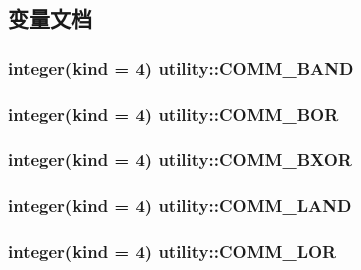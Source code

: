 \subsection{变量文档}
\hypertarget{namespaceutility_ad6a4a4dc93ce4c7954383fd79547415e}{
\subsubsection[{COMM\_\-BAND}]{\setlength{\rightskip}{0pt plus 5cm}integer(kind = 4) {\bf utility::COMM\_\-BAND}}}
\label{namespaceutility_ad6a4a4dc93ce4c7954383fd79547415e}
\hypertarget{namespaceutility_a571a1353450878c872ab821842c903bb}{
\subsubsection[{COMM\_\-BOR}]{\setlength{\rightskip}{0pt plus 5cm}integer(kind = 4) {\bf utility::COMM\_\-BOR}}}
\label{namespaceutility_a571a1353450878c872ab821842c903bb}
\hypertarget{namespaceutility_a1738a7d6502f88e9dc6b93be81f43faf}{
\subsubsection[{COMM\_\-BXOR}]{\setlength{\rightskip}{0pt plus 5cm}integer(kind = 4) {\bf utility::COMM\_\-BXOR}}}
\label{namespaceutility_a1738a7d6502f88e9dc6b93be81f43faf}
\hypertarget{namespaceutility_a9f57cfbd8fe711ae3aa4fd939befe32d}{
\subsubsection[{COMM\_\-LAND}]{\setlength{\rightskip}{0pt plus 5cm}integer(kind = 4) {\bf utility::COMM\_\-LAND}}}
\label{namespaceutility_a9f57cfbd8fe711ae3aa4fd939befe32d}
\hypertarget{namespaceutility_a84fc0cdbf8b54f2cff80170d1dd375b5}{
\subsubsection[{COMM\_\-LOR}]{\setlength{\rightskip}{0pt plus 5cm}integer(kind = 4) {\bf utility::COMM\_\-LOR}}}
